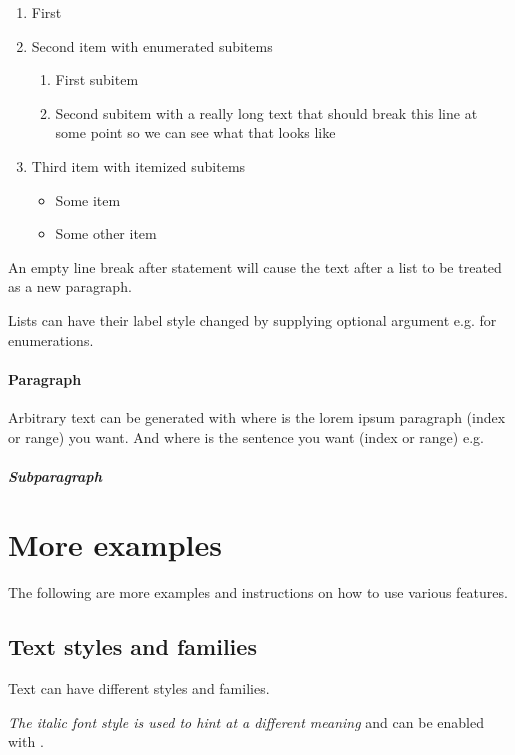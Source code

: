 \begin{enumerate}
    \item First
    \item Second item with enumerated subitems
    \begin{enumerate}
        \item First subitem
        \item Second subitem with a really long text that should break 
            this line at some point so we can see what that looks like
    \end{enumerate}
    \item Third item with itemized subitems
    \begin{itemize}
        \item Some item
        \item Some other item
    \end{itemize}
\end{enumerate}

An empty line break after  statement 
will cause the text after a list to be treated as a new paragraph.

Lists can have their label style changed by supplying optional argument e.g.  for enumerations.

\paragraph{Paragraph}
Arbitrary text can be generated with 
where  is the lorem ipsum paragraph (index or range) you want.
And where  is the sentence you want (index or range) 
e.g. 

\subparagraph{Subparagraph}
\lipsum[1][1-7]


\section{More examples}
The following are more examples and instructions on how to use various features.

\subsection{Text styles and families}
Text can have different styles and families.

\textit{The italic font style is used to hint at a different meaning}
and can be enabled with .

